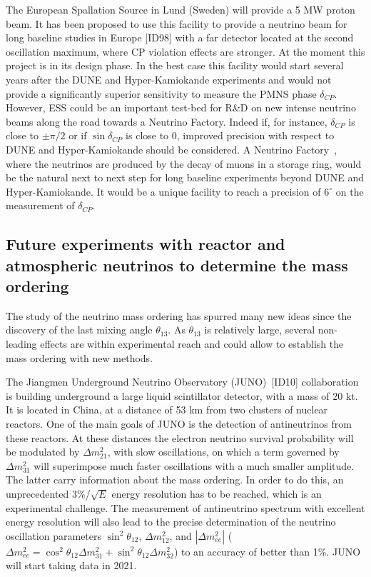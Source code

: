 The European Spallation Source in Lund (Sweden) will provide a 5 MW proton beam. It has been proposed to use this facility to provide a neutrino beam for long baseline studies in Europe [ID98] %
with a far detector located at the second oscillation maximum, where CP violation effects are stronger. At the moment this project is in its design phase. In the best case this facility would start several years after the DUNE and Hyper-Kamiokande experiments and would not provide a significantly superior sensitivity to measure the PMNS phase $\delta_{CP}$. However, ESS could be an important test-bed for R\&D on new intense neutrino beams along the road towards a Neutrino Factory. 
Indeed if, for instance, $\delta_{CP}$ is close to $\pm \pi/2$  or if
$ \sin \delta_{CP} $ is close to 0, improved precision
with respect to DUNE and Hyper-Kamiokande should be considered.
A Neutrino Factory~\cite{Bogomilov:2014koa}, where the neutrinos are produced by the decay of muons in a storage ring, would be the natural next to next step for long baseline experiments beyond DUNE and Hyper-Kamiokande. It would be a unique facility to reach a precision of $6^{\circ}$ on the measurement of $\delta_{CP}$.

\subsection{ Future experiments with reactor and atmospheric neutrinos to determine the mass ordering}

The study of the neutrino mass ordering has spurred many new ideas since the discovery of the last mixing angle $\theta_{13}$. As $\theta_{13}$ is relatively large, several non-leading effects are within experimental reach and could allow to establish the mass ordering with new methods.

The Jiangmen Underground Neutrino Observatory (JUNO)~[ID10] %
collaboration is building underground a large liquid scintillator detector, with a mass of 20 kt. It is located in China, at a distance of 53 km from two clusters of nuclear reactors. One of the main goals of JUNO is the detection of antineutrinos from these reactors. At these distances the electron neutrino survival probability will be  
modulated by $\Delta m^2_{21}$, with slow oscillations, on which a term governed by $ \Delta m^2_{31}$ will superimpose much faster oscillations with a much smaller amplitude. The latter carry information about the mass ordering. In order to do this, an unprecedented 3\%/$\sqrt{E}$ energy resolution has to be reached, which is an experimental challenge.
The measurement of antineutrino spectrum with excellent energy resolution will also lead to the precise determination of the neutrino oscillation parameters $\sin^2 \theta_{12}$, $\Delta m^2_{12}$, and $|\Delta m^2_{ee} |$ ($ \Delta m^2_{ee}= \cos^2 \theta_{12}  \Delta m^2_{31}  + \sin^2 \theta_{12}  \Delta m^2_{32} $) to an accuracy of
better than 1\%. JUNO will start taking data in 2021.

